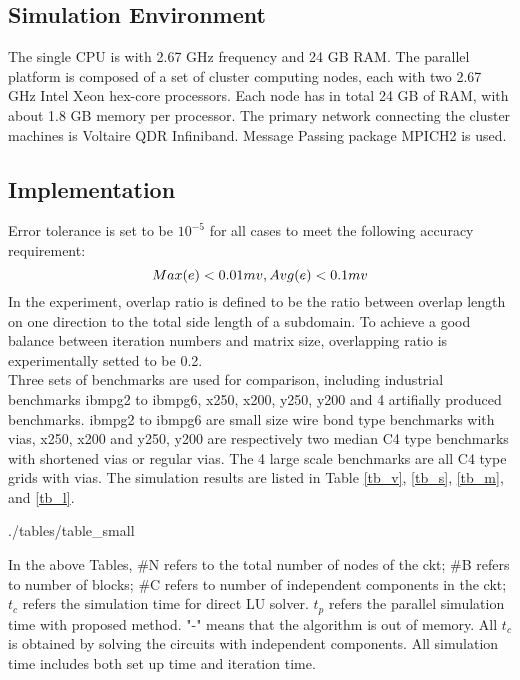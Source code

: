 \documentclass{sig-alternate}
\begin{document}
  \subsection{Simulation Environment}
	The single CPU is with 2.67 GHz frequency and 24 GB RAM. The parallel platform is composed of a set of cluster 
	computing nodes, each with two 2.67 GHz Intel Xeon hex-core processors. Each node has in total 24 GB of RAM, with about 
	1.8 GB memory per processor. The primary network connecting the cluster machines is Voltaire QDR Infiniband. Message 
	Passing package MPICH2 is used.  
  \subsection{Implementation}
	Error tolerance is set to be $10^{-5}$ for all cases to meet the following accuracy requirement:
	\begin{equation}
		Max(e) < 0.01 mv, Avg(e) < 0.1 mv\\ \label{eq_err}
	\end{equation}
	In the experiment, overlap ratio is defined to be the ratio between overlap length on one direction to the total side length of 
	a subdomain. To achieve a good balance between iteration numbers and matrix size, overlapping ratio is experimentally 
	setted to be 0.2.\\
			
	Three sets of benchmarks are used for comparison, including 
	industrial benchmarks ibmpg2 to ibmpg6, x250, x200, y250, y200 and 4 artifially produced benchmarks. ibmpg2 to ibmpg6 are 
	small size wire bond type benchmarks with vias, x250, x200 and y250, y200 are respectively two median C4 type benchmarks with
	shortened vias or regular vias. The 4 large scale benchmarks are all C4 type grids with vias. The simulation results are 
	listed in Table \ref{tb_v}, \ref{tb_s}, \ref{tb_m}, and \ref{tb_l}.\\

	\begin{table}[h]
	   \label{tb_v}
  	   {./tables/table_small} \label{tb_s}
  	   \label{tb_m}
  	   \label{tb_l}
	\end{table}
	
	In the above Tables, \#N refers to the total number of nodes of the ckt; \#B refers to number of blocks; \#C refers to number 
	of independent components in the 
	ckt; $t_c$ refers the simulation time for direct LU solver. $t_p$ refers the parallel simulation time with proposed method. "-"
	means that the algorithm is out of memory. All $t_c$ is obtained by solving the circuits with independent components. All 
	simulation time includes both set up time and iteration time.\\
\end{document}
